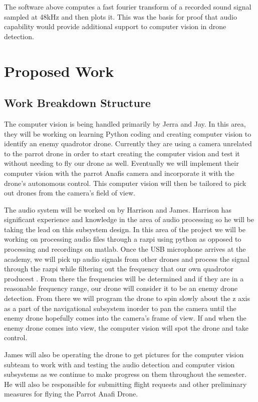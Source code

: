 \documentclass[10pt]{article}
\begin{document}
The software above computes a fast fourier transform of a recorded sound signal sampled at 48kHz and then plots it. This was the basis for proof that audio capability would provide additional support to computer vision in drone detection.

\section{Proposed Work}
\subsection{Work Breakdown Structure}
The computer vision is being handled primarily by Jerra and Jay.  In this area, they will be working on learning Python coding and creating computer vision to identify an enemy quadrotor drone.  Currently they are using a camera unrelated to the parrot drone in order to start creating the computer vision and test it without needing to fly our drone as well.  Eventually we will implement their computer vision with the parrot Anafis camera and incorporate it with the drone’s autonomous control.  This computer vision will then be tailored to pick out drones from the camera’s field of view.
   
The audio system will be worked on by Harrison and James.  Harrison has significant experience and knowledge in the area of audio processing so he will be taking the lead on this subsystem design.  In this area of the project we will be working on processing audio files through a razpi using python as opposed to processing and recordings on matlab.  Once the USB microphone arrives at the academy, we will pick up audio signals from other drones and process the signal through the razpi while filtering out the frequency that our own quadrotor producest .  From there the frequencies will be determined and if they are in a reasonable frequency range, our drone will consider it to be an enemy drone detection.  From there we will program the drone to spin slowly about the z axis as a part of the navigational subsystem inorder to pan the camera until the enemy drone hopefully comes into the camera's frame of view.  If and when the enemy drone comes into view, the computer vision will spot the drone and take control.  

James will also be operating the drone to get pictures for the computer vision subteam to work with and testing the audio detection and computer vision subsystems as we continue to make progress on them throughout the semester.  He will also be responsible for submitting flight requests and other preliminary measures for flying the Parrot Anafi Drone. 
\end{document}
